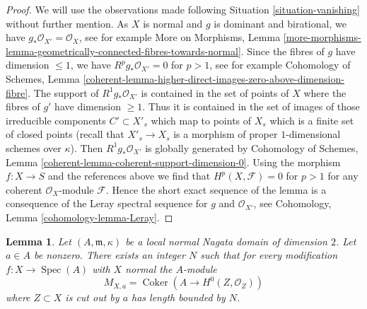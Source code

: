 \documentclass{stacks-project}
\theoremstyle{plain}
\newtheorem{lemma}[subsection]{Lemma}
\theoremstyle{definition}
\theoremstyle{remark}
\numberwithin{equation}{subsection}
\def\Spec{\mathop{\mathrm{Spec}}}
\def\Coker{\mathop{\mathrm{Coker}}}
\begin{document}
\begin{proof}
We will use the observations made following Situation \ref{situation-vanishing}
without further mention. As $X$ is normal and $g$ is dominant and
birational, we have $g_*\mathcal{O}_{X'} = \mathcal{O}_X$, see for
example More on Morphisms, Lemma
\ref{more-morphisms-lemma-geometrically-connected-fibres-towards-normal}.
Since the fibres of $g$ have dimension $\leq 1$, we have
$R^pg_*\mathcal{O}_{X'} = 0$ for $p > 1$, see for example
Cohomology of Schemes, Lemma
\ref{coherent-lemma-higher-direct-images-zero-above-dimension-fibre}.
The support of $R^1g_*\mathcal{O}_{X'}$ is contained in the set of points of
$X$ where the fibres of $g'$ have dimension $\geq 1$. Thus
it is contained in the set of images of those
irreducible components $C' \subset X'_s$ which map to points of $X_s$
which is a finite set of closed points
(recall that $X'_s \to X_s$ is a morphism of proper $1$-dimensional
schemes over $\kappa$). Then $R^1g_*\mathcal{O}_{X'}$ is globally
generated by
Cohomology of Schemes, Lemma \ref{coherent-lemma-coherent-support-dimension-0}.
Using the morphism $f : X \to S$ and the references above we find that
$H^p(X, \mathcal{F}) = 0$ for $p > 1$ for any coherent $\mathcal{O}_X$-module
$\mathcal{F}$. Hence the short exact sequence of the lemma is a consequence
of the Leray spectral sequence for $g$ and $\mathcal{O}_{X'}$, see
Cohomology, Lemma \ref{cohomology-lemma-Leray}.
\end{proof}

\begin{lemma}
\label{lemma-bound-a-torsion}
Let $(A, \mathfrak m, \kappa)$ be a local normal Nagata domain
of dimension $2$. Let $a \in A$ be nonzero. There exists an integer $N$ such
that for every modification $f : X \to \Spec(A)$ with $X$ normal the
$A$-module
$$
M_{X, a} = \Coker(A \longrightarrow H^0(Z, \mathcal{O}_Z))
$$
where $Z \subset X$ is cut out by $a$ has length bounded by $N$.
\end{lemma}
\end{document}
